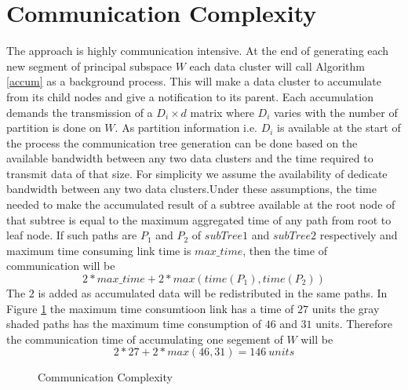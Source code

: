 \documentclass[12pt,notitlepage,oneside]{report}
\begin{document}
\section{Communication Complexity}
The approach is highly communication intensive. At the end of generating each new segment of principal subspace $W$ each data cluster will call Algorithm \ref{accum} as a background process. This will make a data cluster to accumulate from its child nodes and give a notification to its parent. Each accumulation demands the transmission of a $D_i \times d$ matrix where $D_i$ varies with the number of partition is done on $W$. As partition information i.e. $D_i$ is available at the start of the process the communication tree generation can be done based on the available bandwidth between any two data clusters and the time required to transmit data of that size. For simplicity we assume the availability of dedicate bandwidth between any two data clusters.Under these assumptions, the time needed to make the accumulated result of a subtree available at the root node of that subtree is equal to the maximum aggregated time of any path from root to leaf node. If such paths are $P_1$ and $P_2$ of $subTree1$ and $subTree2$ respectively and maximum time consuming link time is $max\_time$, then the time of communication will be $$2*max\_time+2*max(time(P_1),time(P_2))$$ 
The $2$ is added as accumulated data will be redistributed in the same paths. In Figure \ref{fig:comm} the maximum time consumtioon link has a time of $27$ units the gray shaded paths has the maximum time consumption of $46$ and $31$ units. Therefore the communication time of accumulating one segement of $W$ will be $$2*27+2*max(46,31) = 146\ units$$ 

\begin{figure}
    \centering
    \caption{Communication Complexity}
    \label{fig:comm}
\end{figure}
\end{document}
